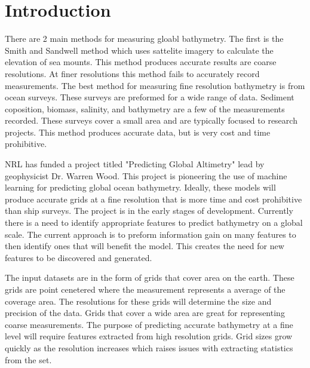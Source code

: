 \section{Introduction}
There are 2 main methods for measuring gloabl bathymetry.
The first is the Smith and Sandwell method which uses sattelite imagery to calculate the elevation of sea mounts.
This method produces accurate results are coarse resolutions.
At finer resolutions this method fails to accurately record measurements.
The best method for measuring fine resolution bathymetry is from ocean surveys.
These surveys are preformed for a wide range of data.
Sediment coposition, biomass, salinity, and bathymetry are a few of the measurements recorded.
These surveys cover a small area and are typically focused to research projects. 
This method produces accurate data, but is very cost and time prohibitive. 
% 

\par
NRL has funded a project titled "Predicting Global Altimetry" lead by geophysicist Dr. Warren Wood.
This project is pioneering the use of machine learning for predicting global ocean bathymetry.
Ideally, these models will produce accurate grids at a fine resolution that is more time and cost prohibitive than ship surveys.
The project is in the early stages of development. 
Currently there is a need to identify appropriate features to predict bathymetry on a global scale. 
The current approach is to preform information gain on many features to then identify ones that will benefit the model.
This creates the need for new features to be discovered and generated. 

\par
The input datasets are in the form of grids that cover area on the earth. 
These grids are point cenetered where the measurement represents a average of the coverage area.
The resolutions for these grids will determine the size and precision of the data.
Grids that cover a wide area are great for representing coarse measurements.
The purpose of predicting accurate bathymetry at a fine level will require features extracted from high resolution grids.
Grid sizes grow quickly as the resolution increases which raises issues with extracting statistics from the set.
